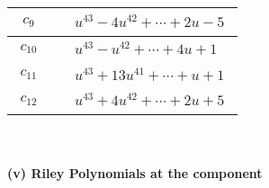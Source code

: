 \documentclass[1p]{elsarticle_modified}
\theoremstyle{definition}
\begin{document}
\begin{tabular}{m{50pt}|m{274pt}}
\hline $$\begin{aligned}c_{9}\end{aligned}$$&$\begin{aligned}
&u^{43}-4 u^{42}+\cdots+2 u-5
\end{aligned}$\\
\hline $$\begin{aligned}c_{10}\end{aligned}$$&$\begin{aligned}
&u^{43}- u^{42}+\cdots+4 u+1
\end{aligned}$\\
\hline $$\begin{aligned}c_{11}\end{aligned}$$&$\begin{aligned}
&u^{43}+13 u^{41}+\cdots+u+1
\end{aligned}$\\
\hline $$\begin{aligned}c_{12}\end{aligned}$$&$\begin{aligned}
&u^{43}+4 u^{42}+\cdots+2 u+5
\end{aligned}$\\
\hline
\end{tabular}\\~\\
\newpage\renewcommand{\arraystretch}{1}
\flushleft \textbf{(v) Riley Polynomials at the component}\newline \\
\end{document}
